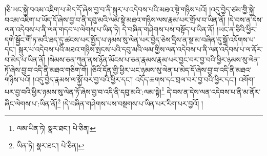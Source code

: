 །ཅི་ཡང་སྐྱེ་བའམ་འཇིག་པ་མེད་དོ་ཞེས་བྱ་བ་ནི་སྐུར་པ་འདེབས་པའི་མཐའ་སྟེ་གཉིས་པའོ། །འདུ་བྱེད་ཙམ་གྱི་སྐྱེ་བའམ་འཇིག་པ་ཡོད་དོ་ཞེས་བྱ་བ་ནི་དབུ་མའི་ལམ་སྟེ་མཐའ་གཉིས་ལས་རྣམ་པར་གྲོལ་བ་ཡིན་ནོ། །དེ་བས་ན་དེས་ལན་འདེབས་པ་ནི་ལན་གདབ་པ་ལེགས་པ་ཡིན་ཏེ། དེ་བཞིན་གཤེགས་པས་བསྟོད་པ་ཡིན་ནོ། །ཡང་ན་ཅིའི་ཕྱིར་དགེ་སྦྱོང་གཽ་ཏ་མའི་ཐད་དུ་ཚངས་པར་སྤྱོད་པ་ཉམས་སུ་ལེན་པར་བྱེད་ཅེས་དྲིས་ན་སྔ་མ་བཞིན་དུ་སྒྲོ་འདོགས་པ་དང་། སྐུར་པ་འདེབས་པའི་མཐའ་གཉིས་སྤངས་པའི་དབུ་མའི་ལམ་གྱིས་ལན་འདེབས་པ་ནི་ལན་འདེབས་པ་ལ་ནོར་བ་མེད་པ་ཡིན་ནོ། །སེམས་ཅན་ཀུན་ནས་ཉོན་མོངས་པ་ཅན་རྣམས་རྣམ་པར་བྱང་བར་བྱ་བའི་ཕྱིར་ཉམས་སུ་ལེན་ཏོ་ཞེས་བྱ་བ་འདི་ནི་མཐའ་གཅིག་གོ། །ཅིའི་དོན་གྱི་ཕྱིར་ཡང་ཉམས་སུ་ལེན་པ་མེད་དོ་ཞེས་བྱ་བ་འདི་ནི་མཐའ་གཉིས་པའོ། །འདུ་བྱེད་རྣམས་ལ་སྐྱོ་བར་བྱ་བའི་ཕྱིར་དང་། འདོད་ཆགས་དང་བྲལ་བར་བྱ་བའི་ཕྱིར་དང་། འགོག་པར་བྱ་བའི་ཕྱིར་ཉམས་སུ་ལེན་ཏོ་ཞེས་བྱ་བ་འདི་ནི་དབུ་མའི་:ལམ་སྟེ།\footnote{ལམ་ཡིན་ཏེ།  སྣར་ཐང་།  པེ་ཅིན། } དེ་བས་ན་དེས་ལན་འདེབས་པ་ནི་མ་ནོར་ཞིང་ལེགས་པ་:ཡིན་ནོ།\footnote{ཡིན་ཏེ།  སྣར་ཐང་།  པེ་ཅིན། } །དེ་བཞིན་གཤེགས་པས་བསྔགས་པ་ཡིན་པར་རིག་པར་བྱའོ། །
